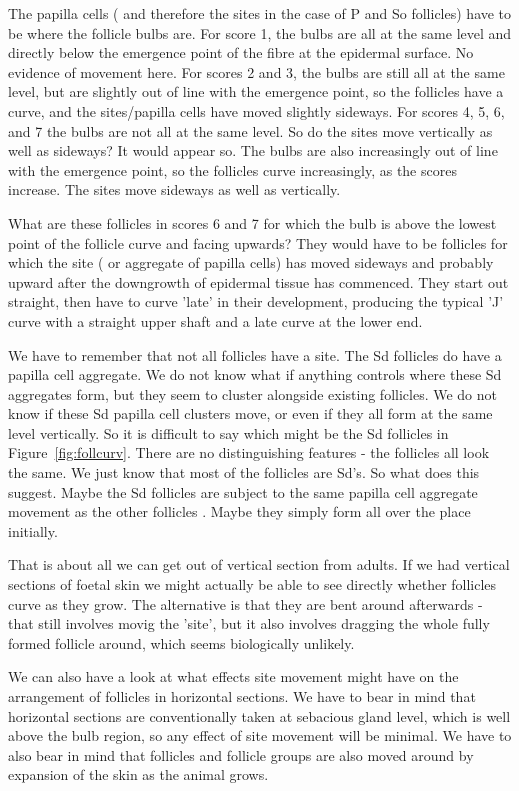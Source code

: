 \documentclass[titlepage]{article}  %
\begin{document}
The papilla cells ( and therefore the sites in the case of P and So follicles) have to be where the follicle bulbs are. For score 1, the bulbs are all at the same level and directly below the emergence point of the fibre at the epidermal surface. No evidence of movement here. For scores 2 and 3, the bulbs are still all at the same level, but are slightly out of line with the emergence point, so the follicles have a curve, and the sites/papilla cells have moved slightly sideways. For scores 4, 5, 6, and 7 the bulbs are not all at the same level. So do the sites move vertically as well as sideways? It would appear so.  The bulbs are also increasingly out of line with the emergence point, so the follicles curve increasingly, as the scores increase. The sites move sideways as well as vertically. 

What are these follicles in scores 6 and 7 for which the bulb is above the lowest point of the follicle curve and facing upwards?  They would have to be follicles for which the site ( or aggregate of papilla cells) has moved sideways and probably upward after the downgrowth of epidermal tissue has commenced.  They start out straight, then have to curve 'late' in their development, producing the typical 'J' curve with a straight upper shaft and a late curve at the lower end.
 
We have to remember that not all follicles have a site. The Sd follicles  do have a papilla cell aggregate. We do not know  what if anything controls where these Sd aggregates form, but they  seem to cluster alongside existing follicles. We do not know if these Sd papilla cell clusters move, or even if they all form at the same level vertically. So it is difficult to say which might be the Sd follicles in Figure~\ref{fig:follcurv}. There are no distinguishing features - the follicles all look the same. We just know that most of the follicles are Sd's. So what does this suggest. Maybe the Sd follicles are subject to the same papilla cell aggregate movement as the other follicles . Maybe they simply form all over the place initially. 

That is about all we can get out of vertical section from adults. If we had vertical sections of foetal skin we might actually be able to see directly whether follicles curve as they grow. The alternative is that they are bent around afterwards - that still involves movig the 'site', but it also involves dragging the whole fully formed follicle around, which seems biologically unlikely.

We can also have a look at what effects site movement might have on the arrangement of follicles in horizontal sections. We have to bear in mind that horizontal sections are conventionally taken at sebacious gland level, which is well above the bulb region, so any effect of site movement will be minimal. We have to also bear in mind that  follicles and follicle groups are also moved around by expansion of the skin as the animal grows. 
\end{document}
